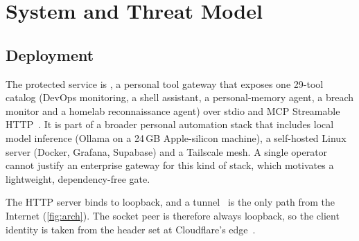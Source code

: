 \documentclass[10pt,twocolumn]{article}
\begin{document}
\section{System and Threat Model}\label{sec:design}

\subsection{Deployment}
The protected service is \kit{}, a personal tool gateway that exposes one
29-tool catalog (DevOps monitoring, a shell assistant, a personal-memory
agent, a breach monitor and a homelab reconnaissance agent) over stdio and
MCP Streamable HTTP~\citep{mcpspec}. It is part of a broader personal
automation stack that includes local model inference (Ollama on a 24\,GB
Apple-silicon machine), a self-hosted Linux server (Docker, Grafana, Supabase)
and a Tailscale mesh. A single operator cannot justify an enterprise gateway for
this kind of stack, which motivates a lightweight, dependency-free gate.

The HTTP server binds to loopback, and a
 tunnel~\citep{cftunnel} is the only path from the Internet
(\cref{fig:arch}). The socket peer is therefore always loopback, so the client
identity is taken from the  header set at Cloudflare's
edge~\citep{cfheaders}.
\end{document}
